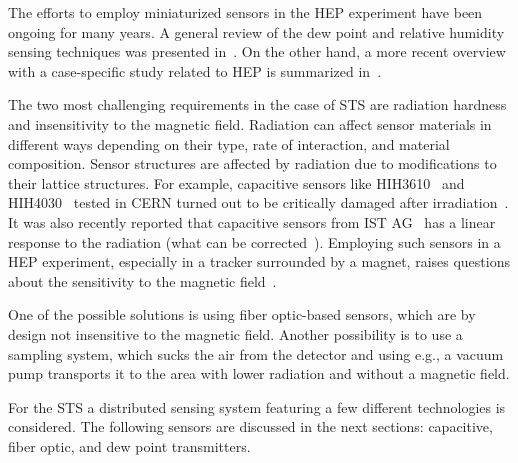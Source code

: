The efforts to employ miniaturized sensors in the \gls{HEP} experiment have been ongoing for many years. A general review of the dew point and relative humidity sensing techniques was presented in~\cite{RITTERSMA}. On the other hand, a more recent overview with a case-specific study related to \gls{HEP} is summarized in~\cite{Kapic}.

The two most challenging requirements in the case of \gls{STS} are radiation hardness and insensitivity to the magnetic field. Radiation can affect sensor materials in different ways depending on their type, rate of interaction, and material composition. Sensor structures are affected by radiation due to modifications to their lattice structures. For example, capacitive sensors like HIH3610~\cite{HIH3610} and HIH4030~\cite{HIH4030} tested in CERN turned out to be critically damaged after irradiation~\cite{Berruti}. It was also recently reported that capacitive sensors from IST AG~\cite{MK33} has a linear response to the radiation (what can be corrected~\cite{Kapic_sensor}). Employing such sensors in a \gls{HEP} experiment, especially in a tracker surrounded by a magnet, raises questions about the sensitivity to the magnetic field~\cite{Berruti}. 

One of the possible solutions is using fiber optic-based sensors, which are by design not insensitive to the magnetic field. Another possibility is to use a sampling system, which sucks the air from the detector and using e.g., a vacuum pump transports it to the area with lower radiation and without a magnetic field.

For the \gls{STS} a distributed sensing system featuring a few different technologies is considered. The following sensors are discussed in the next sections: capacitive, fiber optic, and dew point transmitters. 


